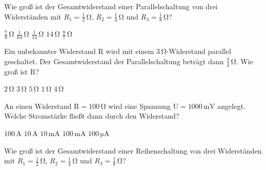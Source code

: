 \documentclass[11pt]{exam}
\begin{document}
\setlength{\voffset}{-0.5in}
\setlength{\headsep}{5pt}

\hspace{2mm}
 \hspace{5mm}
\vspace{4mm}

\begin{questions}

\question Wie groß ist der Gesamtwiderstand einer Parallelschaltung von drei Widerständen mit \(R_1=\mathrm{\frac{1}{2}\,\Omega}\), \(R_2=\mathrm{\frac{1}{4}\,\Omega}\) und \(R_3=\mathrm{\frac{1}{8}\,\Omega}\)?

\begin{choices}
	\choice \(\mathrm{\frac{7}{8}\,\Omega}\)
	\choice \(\mathrm{\frac{1}{64}\,\Omega}\)
	\choice \(\mathrm{\frac{1}{14}\,\Omega}\)
	\choice \(\mathrm{14\,\Omega}\)
	\choice \(\mathrm{\frac{8}{7}\,\Omega}\)
\end{choices}

\vspace{3mm}\question Ein unbekannter Widerstand \(\mathrm{R}\) wird mit einem \(\mathrm{3\,\Omega}\)-Widerstand parallel geschaltet. Der Gesamtwiderstand der Parallelschaltung beträgt dann \(\mathrm{\frac{3}{4}\,\Omega}\). Wie groß ist \(\mathrm{R}\)?

\begin{choices}
	\choice \(\mathrm{2\,\Omega}\)
	\choice \(\mathrm{3\,\Omega}\)
	\choice \(\mathrm{5\,\Omega}\)
	\choice \(\mathrm{1\,\Omega}\)
	\choice \(\mathrm{4\,\Omega}\)
\end{choices}

\vspace{3mm}\question An einen Widerstand \(\mathrm{R=100\,\Omega}\) wird eine Spannung \(\mathrm{U=1000\,mV}\) angelegt. Welche Stromstärke fließt dann durch den Widerstand?

\begin{choices}
	\choice \(\mathrm{100\,A}\)
	\choice \(\mathrm{10\,A}\)
	\choice \(\mathrm{10\,mA}\)
	\choice \(\mathrm{100\,mA}\)
	\choice \(\mathrm{100\,\mu A}\)
\end{choices}

\vspace{3mm}\question Wie groß ist der Gesamtwiderstand einer Reihenschaltung von drei Widerständen mit \(R_1=\mathrm{\frac{1}{2}\,\Omega}\), \(R_2=\mathrm{\frac{1}{4}\,\Omega}\) und \(R_3=\mathrm{\frac{1}{8}\,\Omega}\)?


\end{questions}
\end{document}
